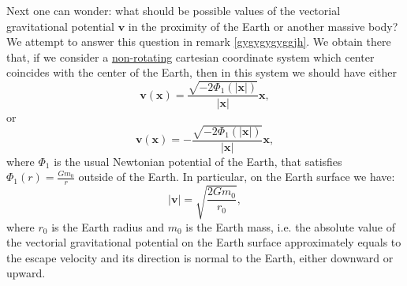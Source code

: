 \documentclass{article}
\theoremstyle{definition}
\theoremstyle{remark}
\renewcommand{\vec}[1]{\mathbf{#1}}
\begin{document}
Next one can wonder: what should be possible values of the vectorial
gravitational potential $\vec v$ in the proximity of the Earth or
another massive body? We attempt to answer this question in remark
\ref{gygygygyggjh}. We obtain there that, if we consider a
\underline{non-rotating} cartesian coordinate system which center
coincides with the center of the Earth, then in this system we
should have either
\begin{equation}
\label{MaxVacFull1ninshtrgravortghhghgjkgghklhjgkghghjjkjhjkkggjkhjkhjjhhfhjhklkhkhjjklzzzyyyhjggjhgghhjhNWNWBWHWPPN222kkkgtytghjjhpoppkkkhhhkhjhjint}
\vec v(\vec x)= \frac{\sqrt{-2\Phi_1(|\vec x|)}}{|\vec x|}\vec x,
\end{equation}
or
\begin{equation}
\label{MaxVacFull1ninshtrgravortghhghgjkgghklhjgkghghjjkjhjkkggjkhjkhjjhhfhjhklkhkhjjklzzzyyyhjggjhgghhjhNWNWBWHWPPN222kkkgtytghjjhpoppkkkhhhkhjhjiuuint}
\vec v(\vec x)= -\frac{\sqrt{-2\Phi_1(|\vec x|)}}{|\vec x|}\vec x,
\end{equation}
where $\Phi_1$ is the usual Newtonian potential of the Earth, that
satisfies $\Phi_1(r)=\frac{Gm_0}{r}$ outside of the Earth. In
particular, on the Earth surface we have:
\begin{equation}
\label{MaxVacFull1ninshtrgravortghhghgjkgghklhjgkghghjjkjhjkkggjkhjkhjjhhfhjhklkhkhjjklzzzyyyhjggjhgghhjhNWNWBWHWPPN222kkkgtytghjjhpoppkkkhhhkhjhjiuuokokokint}
|\vec v|=\sqrt{\frac{2Gm_0}{r_0}},
\end{equation}
where $r_0$ is the Earth radius and $m_0$ is the Earth mass, i.e.
the absolute value of the vectorial gravitational potential on the
Earth surface approximately equals to the escape velocity and its
direction is normal to the Earth, either downward or upward.
\end{document}
